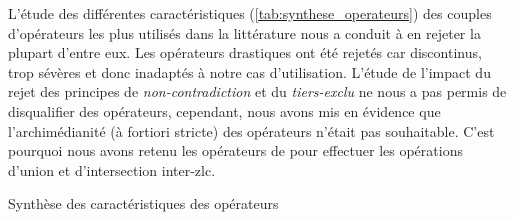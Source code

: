 L'étude des différentes caractéristiques
(\autoref{tab:synthese_operateurs}) des couples d'opérateurs les plus
utilisés dans la littérature nous a conduit à en rejeter la plupart
d'entre eux. Les opérateurs drastiques ont été rejetés car
discontinus, trop sévères et donc inadaptés à notre cas
d'utilisation. L'étude de l'impact du rejet des principes de
\emph{non-contradiction} et du \emph{tiers-exclu} ne nous a pas permis
de disqualifier des opérateurs, cependant, nous avons mis en évidence
que l'archimédianité (à fortiori stricte) des opérateurs n'était pas
souhaitable. C'est pourquoi nous avons retenu les opérateurs de
\textcite{Zadeh1965} pour effectuer les opérations d'union et
d'intersection inter-\ac{zlc}.

\begin{table}
  \centering
  
  \caption{Synthèse des caractéristiques des opérateurs}
  \label{tab:synthese_operateurs}
\end{table}



